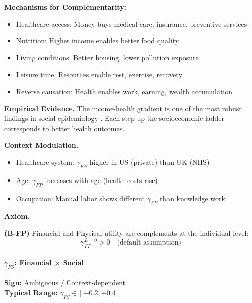 \textbf{Mechanisms for Complementarity:}
\begin{itemize}
    \item Healthcare access: Money buys medical care, insurance, preventive services
    \item Nutrition: Higher income enables better food quality
    \item Living conditions: Better housing, lower pollution exposure
    \item Leisure time: Resources enable rest, exercise, recovery
    \item Reverse causation: Health enables work, earning, wealth accumulation
\end{itemize}

\textbf{Empirical Evidence.}
The income-health gradient is one of the most robust findings in social 
epidemiology \citep{marmot2004status}. Each step up the socioeconomic ladder 
corresponds to better health outcomes.

\textbf{Context Modulation.}
\begin{itemize}
    \item Healthcare system: $\gamma_{FP}$ higher in US (private) than UK (NHS)
    \item Age: $\gamma_{FP}$ increases with age (health costs rise)
    \item Occupation: Manual labor shows different $\gamma_{FP}$ than knowledge work
\end{itemize}

\textbf{Axiom.}
\begin{axiom}
\label{ax:B-FP}
\textbf{(B-FP)} Financial and Physical utility are complements at the individual level:
\begin{equation}
    \gamma^{L=0}_{FP} > 0 \quad \text{(default assumption)}
\end{equation}
\end{axiom}


\paragraph{$\gamma_{FS}$: Financial × Social}

\begin{tcolorbox}[colback=yellow!5, colframe=yellow!50!black]
\textbf{Sign:} Ambiguous / Context-dependent \\
\textbf{Typical Range:} $\gamma_{FS} \in [-0.2, +0.4]$
\end{tcolorbox}

